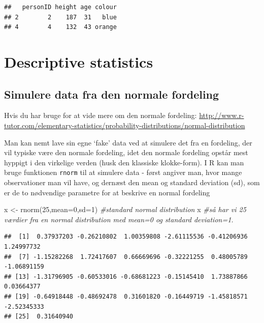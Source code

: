 \documentclass[
]{book}
\newenvironment{Shaded}{\begin{snugshade}}{\end{snugshade}}
\newcommand{\AttributeTok}[1]{\textcolor[rgb]{0.77,0.63,0.00}{#1}}
\newcommand{\CommentTok}[1]{\textcolor[rgb]{0.56,0.35,0.01}{\textit{#1}}}
\newcommand{\DecValTok}[1]{\textcolor[rgb]{0.00,0.00,0.81}{#1}}
\newcommand{\FunctionTok}[1]{\textcolor[rgb]{0.00,0.00,0.00}{#1}}
\newcommand{\NormalTok}[1]{#1}
\newcommand{\OtherTok}[1]{\textcolor[rgb]{0.56,0.35,0.01}{#1}}
\begin{document}
\begin{verbatim}
##   personID height age colour
## 2        2    187  31   blue
## 4        4    132  43 orange
\end{verbatim}

\hypertarget{descriptive-statistics}{%
\section{Descriptive statistics}\label{descriptive-statistics}}

\hypertarget{simulere-data-fra-den-normale-fordeling}{%
\subsection{Simulere data fra den normale fordeling}\label{simulere-data-fra-den-normale-fordeling}}

Hvis du har bruge for at vide mere om den normale fordeling: \url{http://www.r-tutor.com/elementary-statistics/probability-distributions/normal-distribution}

Man kan nemt lave sin egne `fake' data ved at simulere det fra en fordeling, der vil typiske være den normale fordeling, idet den normale fordeling opstår mest hyppigt i den virkelige verden (husk den klassiske klokke-form). I R kan man bruge funktionen \texttt{rnorm} til at simulere data - først angiver man, hvor mange observationer man vil have, og dernæst den mean og standard deviation (sd), som er de to nødvendige parametre for at beskrive en normal fordeling

\begin{Shaded}
\begin{Highlighting}[]
\NormalTok{x }\OtherTok{\textless{}{-}} \FunctionTok{rnorm}\NormalTok{(}\DecValTok{25}\NormalTok{,}\AttributeTok{mean=}\DecValTok{0}\NormalTok{,}\AttributeTok{sd=}\DecValTok{1}\NormalTok{) }\CommentTok{\#standard normal distribution}
\NormalTok{x }\CommentTok{\#så har vi 25 værdier fra en normal distribution med mean=0 og standard deviation=1.}
\end{Highlighting}
\end{Shaded}

\begin{verbatim}
##  [1]  0.37937203 -0.26210802  1.00359808 -2.61115536 -0.41206936  1.24997732
##  [7] -1.15282268  1.72417607  0.66669696 -0.32221255  0.48005789 -1.06891159
## [13] -1.31796905 -0.60533016 -0.68681223 -0.15145410  1.73887866  0.03664377
## [19] -0.64918448 -0.48692478  0.31601820 -0.16449719 -1.45818571 -2.52345333
## [25]  0.31640940
\end{verbatim}
\end{document}
